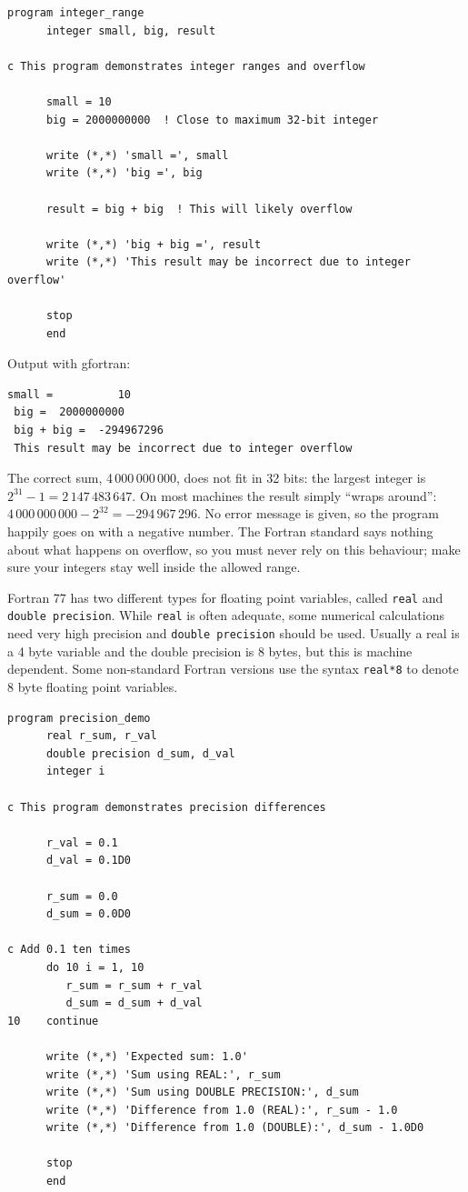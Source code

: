 \begin{lstlisting}[style=fortran77]
      program integer_range
      integer small, big, result
      
c This program demonstrates integer ranges and overflow
      
      small = 10
      big = 2000000000  ! Close to maximum 32-bit integer
      
      write (*,*) 'small =', small
      write (*,*) 'big =', big
      
      result = big + big  ! This will likely overflow
      
      write (*,*) 'big + big =', result
      write (*,*) 'This result may be incorrect due to integer overflow'

      stop
      end
\end{lstlisting}

Output with gfortran:

\begin{lstlisting}[style=output]
 small =          10
 big =  2000000000
 big + big =  -294967296
 This result may be incorrect due to integer overflow
\end{lstlisting}

The correct sum, 4\,000\,000\,000, does not fit in 32 bits: the largest integer is $2^{31}-1 = 2\,147\,483\,647$. On most machines the result simply ``wraps around'': $4\,000\,000\,000 - 2^{32} = -294\,967\,296$. No error message is given, so the program happily goes on with a negative number. The Fortran standard says nothing about what happens on overflow, so you must never rely on this behaviour; make sure your integers stay well inside the allowed range.

Fortran 77 has two different types for floating point variables, called \texttt{real} and \texttt{double precision}. While \texttt{real} is often adequate, some numerical calculations need very high precision and \texttt{double precision} should be used. Usually a real is a 4 byte variable and the double precision is 8 bytes, but this is machine dependent. Some non-standard Fortran versions use the syntax \texttt{real*8} to denote 8 byte floating point variables.

\begin{lstlisting}[style=fortran77]
      program precision_demo
      real r_sum, r_val
      double precision d_sum, d_val
      integer i
      
c This program demonstrates precision differences
      
      r_val = 0.1
      d_val = 0.1D0
      
      r_sum = 0.0
      d_sum = 0.0D0
      
c Add 0.1 ten times
      do 10 i = 1, 10
         r_sum = r_sum + r_val
         d_sum = d_sum + d_val
10    continue
      
      write (*,*) 'Expected sum: 1.0'
      write (*,*) 'Sum using REAL:', r_sum
      write (*,*) 'Sum using DOUBLE PRECISION:', d_sum
      write (*,*) 'Difference from 1.0 (REAL):', r_sum - 1.0
      write (*,*) 'Difference from 1.0 (DOUBLE):', d_sum - 1.0D0

      stop
      end
\end{lstlisting}

